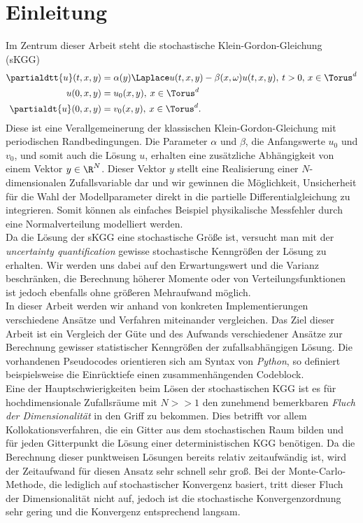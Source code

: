 
\chapter{Einleitung}
Im Zentrum dieser Arbeit steht die stochastische Klein-Gordon-Gleichung (sKGG)
\begin{align*}
\partialdtt{u}(t,x,y)&=\alpha(y) \Laplace u(t,x,y) - \beta(x,\omega)u(t,x,y), \: t>0, \, x\in \Torus^d\\
u(0,x,y)&=u_0(x,y), \: x\in \Torus^d\\
\partialdt{u}(0,x,y)&=v_0(x,y), \: x\in \Torus^d.
\end{align*}
Diese ist eine Verallgemeinerung der klassischen Klein-Gordon-Gleichung mit periodischen Randbedingungen. Die Parameter $\alpha$ und $\beta$, die Anfangswerte $u_0$ und $v_0$, und somit auch die Lösung $u$, erhalten eine zusätzliche Abhängigkeit von einem Vektor $y\in\R^N$. Dieser Vektor $y$ stellt eine Realisierung einer $N$-dimensionalen Zufallsvariable dar und wir gewinnen die Möglichkeit, Unsicherheit für die Wahl der Modellparameter direkt in die partielle Differentialgleichung zu integrieren. Somit können als einfaches Beispiel physikalische Messfehler durch eine Normalverteilung modelliert werden.\\[0.2cm]
Da die Lösung der sKGG eine stochastische Größe ist, versucht man mit der \emph{uncertainty quantification} gewisse stochastische Kenngrößen der Lösung zu erhalten. Wir werden uns dabei auf den Erwartungswert und die Varianz beschränken, die Berechnung höherer Momente oder von Verteilungsfunktionen ist jedoch ebenfalls ohne größeren Mehraufwand möglich.\\In dieser Arbeit werden wir anhand von konkreten Implementierungen verschiedene Ansätze und Verfahren miteinander vergleichen. Das Ziel dieser Arbeit ist ein Vergleich der Güte und des Aufwands verschiedener Ansätze zur Berechnung gewisser statistischer Kenngrößen der zufallsabhängigen Lösung. Die vorhandenen Pseudocodes orientieren sich am Syntax von \emph{Python}, so definiert beispielsweise die Einrücktiefe einen zusammenhängenden Codeblock.\\
Eine der Hauptschwierigkeiten beim Lösen der stochastischen KGG ist es für hochdimensionale Zufallsräume mit $N>>1$ den zunehmend bemerkbaren \emph{Fluch der Dimensionalität} in den Griff zu bekommen. Dies betrifft vor allem Kollokationsverfahren, die ein Gitter aus dem stochastischen Raum bilden und für jeden Gitterpunkt die Lösung einer deterministischen KGG benötigen. Da die Berechnung dieser punktweisen Lösungen bereits relativ zeitaufwändig ist, wird der Zeitaufwand für diesen Ansatz sehr schnell sehr groß. Bei der Monte-Carlo-Methode, die lediglich auf stochastischer Konvergenz basiert, tritt dieser Fluch der Dimensionalität nicht auf, jedoch ist die stochastische Konvergenzordnung sehr gering und die Konvergenz entsprechend langsam.\\
